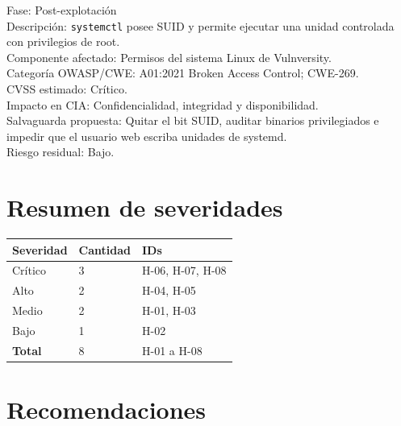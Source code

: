 \documentclass[11pt,a4paper]{article}
\begin{document}
\begin{campo}
Fase: Post-explotación\\
Descripción: \texttt{systemctl} posee SUID y permite ejecutar una unidad controlada con privilegios de root.\\
Componente afectado: Permisos del sistema Linux de Vulnversity.\\
Categoría OWASP/CWE: A01:2021 Broken Access Control; CWE-269.\\
CVSS estimado: Crítico.\\
Impacto en CIA: Confidencialidad, integridad y disponibilidad.\\
Salvaguarda propuesta: Quitar el bit SUID, auditar binarios privilegiados e impedir que el usuario web escriba unidades de systemd.\\
Riesgo residual: Bajo.
\end{campo}

\section{Resumen de severidades}

\begin{center}
\renewcommand{\arraystretch}{1.4}
\begin{tabularx}{0.8\textwidth}{@{}p{4cm}p{3cm}X@{}}
\toprule
\textbf{Severidad} & \textbf{Cantidad} & \textbf{IDs}\\
\midrule
Crítico & 3 & H-06, H-07, H-08\\
Alto & 2 & H-04, H-05\\
Medio & 2 & H-01, H-03\\
Bajo & 1 & H-02\\
\midrule
\textbf{Total} & 8 & H-01 a H-08\\
\bottomrule
\end{tabularx}
\end{center}

\section{Recomendaciones}
\end{document}
